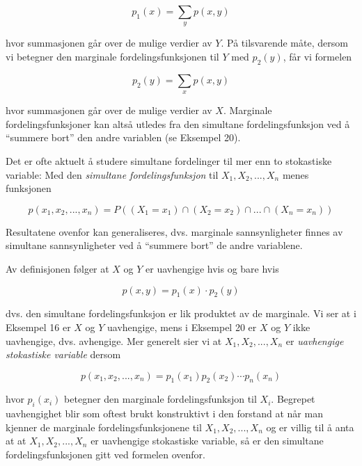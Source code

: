 \[ p_1(x)=\sum_yp(x,y) \]

\noindent hvor summasjonen går over de mulige verdier av $Y$.
På tilsvarende måte, dersom vi betegner den marginale
fordelingsfunksjonen til $Y$ med $p_2(y)$, får vi formelen

\[ p_2(y)=\sum_xp(x,y) \]

\noindent hvor summasjonen går over de mulige verdier av $X$. Marginale
forde\-lingsfunksjoner kan altså utledes fra den simultane
fordelingsfunksjon ved å ``summere bort'' den andre variablen (se
Eksempel 20).

Det er ofte aktuelt å studere simultane fordelinger til mer enn
to stokastiske variable:
Med den {\em simultane fordelingsfunksjon} til $X_1, X_2, ...,
X_n$ menes funksjonen

\[ p(x_1, x_2, ..., x_n)=P((X_1=x_1)\cap (X_2=x_2)\cap ...\cap
                                                 (X_n=x_n)) \]

\noindent Resultatene ovenfor kan generaliseres, dvs. marginale
sannsynligheter finnes av simultane sannsynligheter
ved å ``summere bort'' de andre variablene.

\begin{center}  \end{center}
Av definisjonen følger at $X$ og $Y$ er uavhengige hvis og bare
hvis

\[     p(x,y)=p_1(x)\cdot p_2(y)   \]

\noindent dvs. den simultane fordelingsfunksjon er lik produktet av de
marginale. Vi ser at i Eksempel 16 er $X$ og $Y$ uavhengige, mens
i Eksempel 20 er $X$ og $Y$ ikke uavhengige, dvs. avhengige. Mer
generelt sier vi at $X_1, X_2, ..., X_n$ er {\em uavhengige
stokastiske variable} dersom

\[  p(x_1, x_2, ..., x_n)=p_1(x_1)p_2(x_2)\cdots p_n(x_n) \]

\noindent hvor $p_i(x_i)$ betegner den marginale fordelingsfunksjon til
$X_i$. Begrepet uavhengighet blir som oftest brukt konstruktivt i
den forstand at når man kjenner de marginale
fordelingsfunksjonene til $X_1, X_2, ..., X_n$ og er villig til å
anta at at $X_1, X_2, ..., X_n$ er uavhengige stokastiske
variable, så er den simultane fordelingsfunksjonen gitt ved
formelen ovenfor. \\

